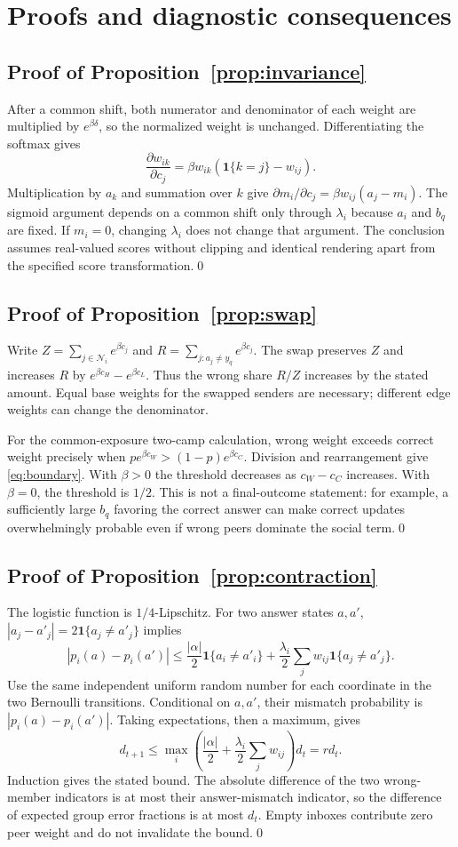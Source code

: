 \documentclass[11pt]{article}
\newcommand{\ind}{\mathbf 1}
\newcommand{\calN}{\mathcal N}
\begin{document}
\appendix
\section{Proofs and diagnostic consequences}
\label{app:proofs}
\subsection{Proof of Proposition~\ref{prop:invariance}}
After a common shift, both numerator and denominator of each weight are multiplied by $e^{\beta\delta}$, so the normalized weight is unchanged. Differentiating the softmax gives
\[
 \frac{\partial w_{ik}}{\partial c_j}
 =\beta w_{ik}(\ind\{k=j\}-w_{ij}).
\]
Multiplication by $a_k$ and summation over $k$ give $\partial m_i/\partial c_j=\beta w_{ij}(a_j-m_i)$. The sigmoid argument depends on a common shift only through $\lambda_i$ because $a_i$ and $b_q$ are fixed. If $m_i=0$, changing $\lambda_i$ does not change that argument. The conclusion assumes real-valued scores without clipping and identical rendering apart from the specified score transformation.\qed

\subsection{Proof of Proposition~\ref{prop:swap}}
Write $Z=\sum_{j\in\calN_i}e^{\beta c_j}$ and $R=\sum_{j:a_j\ne y_q}e^{\beta c_j}$. The swap preserves $Z$ and increases $R$ by $e^{\beta c_H}-e^{\beta c_L}$. Thus the wrong share $R/Z$ increases by the stated amount. Equal base weights for the swapped senders are necessary; different edge weights can change the denominator.

For the common-exposure two-camp calculation, wrong weight exceeds correct weight precisely when $p e^{\beta c_W}>(1-p)e^{\beta c_C}$. Division and rearrangement give \eqref{eq:boundary}. With $\beta>0$ the threshold decreases as $c_W-c_C$ increases. With $\beta=0$, the threshold is $1/2$. This is not a final-outcome statement: for example, a sufficiently large $b_q$ favoring the correct answer can make correct updates overwhelmingly probable even if wrong peers dominate the social term.\qed

\subsection{Proof of Proposition~\ref{prop:contraction}}
The logistic function is $1/4$-Lipschitz. For two answer states $a,a'$, $|a_j-a'_j|=2\ind\{a_j\ne a'_j\}$ implies
\[
 |p_i(a)-p_i(a')|
 \le \frac{|\alpha|}{2}\ind\{a_i\ne a'_i\}
 +\frac{\lambda_i}{2}\sum_jw_{ij}\ind\{a_j\ne a'_j\}.
\]
Use the same independent uniform random number for each coordinate in the two Bernoulli transitions. Conditional on $a,a'$, their mismatch probability is $|p_i(a)-p_i(a')|$. Taking expectations, then a maximum, gives
\[
 d_{t+1}\le \max_i\left(\frac{|\alpha|}{2}+\frac{\lambda_i}{2}\sum_jw_{ij}\right)d_t=r d_t.
\]
Induction gives the stated bound. The absolute difference of the two wrong-member indicators is at most their answer-mismatch indicator, so the difference of expected group error fractions is at most $d_t$. Empty inboxes contribute zero peer weight and do not invalidate the bound.\qed
\end{document}
